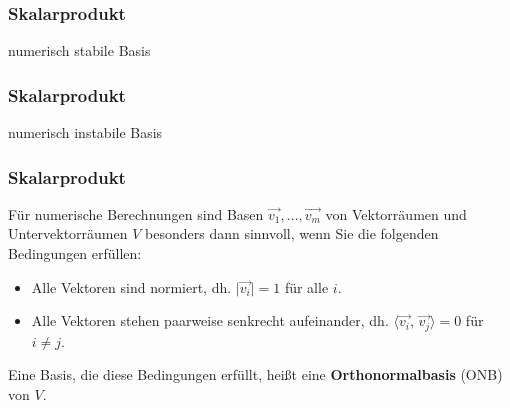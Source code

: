 \documentclass[hyperref={pdfpagelabels=false}]{beamer}
\theoremstyle{plain}%
\theoremstyle{definition}
\theoremstyle{remark}
\newcommand{\vektor}[1]{\overrightarrow{#1}}
\begin{document}
\begin{frame}
\frametitle{Skalarprodukt}
numerisch stabile Basis

\begin{figure}[H]
	\vspace{-0.9cm}
	\begin{center}
	\begin{scaletikzpicturetowidth}{0.8\textwidth}
     		 
	\end{scaletikzpicturetowidth}
	\end{center}
	\vspace{-1.2cm}
\end{figure}

\end{frame}

\begin{frame}
\frametitle{Skalarprodukt}
numerisch instabile Basis

\begin{figure}[H]
	\vspace{-0.9cm}
	\begin{center}
	\begin{scaletikzpicturetowidth}{0.8\textwidth}
     		 
	\end{scaletikzpicturetowidth}
	\end{center}
	\vspace{-1.2cm}
\end{figure}

\end{frame}


\begin{frame}
\frametitle{Skalarprodukt}

Für numerische Berechnungen sind Basen $\vektor{v_1}, \ldots, \vektor{v_m}$  von Vektorräumen und 
Untervektorräumen $V$ besonders dann sinnvoll, wenn Sie die folgenden Bedingungen erfüllen: 

\begin{itemize} 
\item<2-> Alle Vektoren sind normiert, dh. $\vert \vektor{v_i} \vert = 1$ für alle $i$. 
\item<3-> Alle Vektoren stehen paarweise senkrecht aufeinander, dh. $\langle \vektor{v_i}, \, \vektor{v_j} \rangle = 0$ für 
$i \neq j$. 
\end{itemize}

\pause \pause \pause 
\bigbreak
\begin{definition} Eine Basis, die diese Bedingungen erfüllt, heißt eine \textbf{Orthonormalbasis} (ONB) von $V$. 
\end{definition}
\end{frame}
\end{document}
